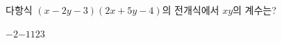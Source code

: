 다항식 $(x-2y-3)(2x+5y-4)$의 전개식에서 $xy$의 계수는?
\begin{choices32}{$-2$}{$-1$}{$1$}{$2$}{$3$}\end{choices32}
